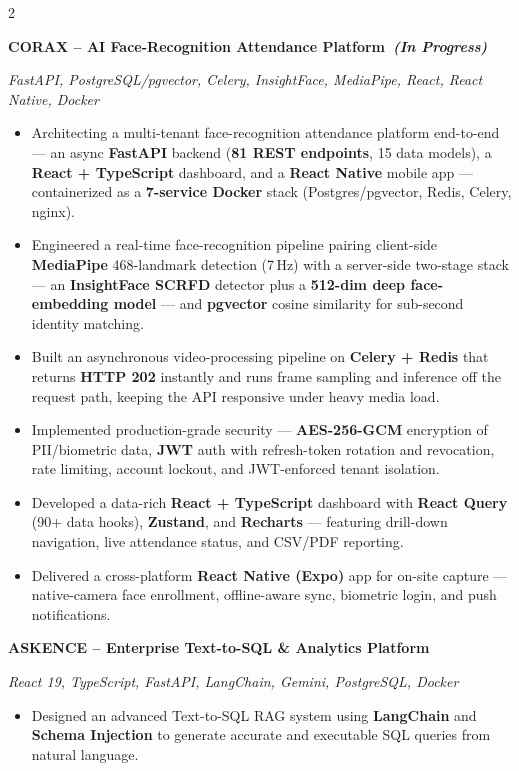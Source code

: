 \documentclass[11pt,a4paper,ragged2e,withhyper]{altacv}
\newcommand{\projecttitle}[1]{%
  \par\smallskip
  \needspace{4\baselineskip}%
  {\textcolor{VividPurple}{\normalsize\bfseries #1}}\par
}
\newcommand{\projectstack}[1]{%
  {\footnotesize\itshape #1}\par\vspace{0.5mm}
}
\newcommand{\projectsep}{%
  \par\vspace{1mm}
  {\color{gray!35}\noindent\makebox[\linewidth]{\dotfill}}
  \par\vspace{1mm}
}
\begin{document}
\begin{paracol}{2}
\switchcolumn
{}
\projecttitle{CORAX -- AI Face-Recognition Attendance Platform~{\normalfont\itshape\footnotesize\color{LightGrey}(In Progress)}}
\projectstack{FastAPI, PostgreSQL/pgvector, Celery, InsightFace, MediaPipe, React, React Native, Docker}
\begin{itemize}
\item Architecting a multi-tenant face-recognition attendance platform end-to-end --- an async \textbf{FastAPI} backend (\textbf{81 REST endpoints}, 15 data models), a \textbf{React + TypeScript} dashboard, and a \textbf{React Native} mobile app --- containerized as a \textbf{7-service Docker} stack (Postgres/pgvector, Redis, Celery, nginx).
\item Engineered a real-time face-recognition pipeline pairing client-side \textbf{MediaPipe} 468-landmark detection (7\,Hz) with a server-side two-stage stack --- an \textbf{InsightFace SCRFD} detector plus a \textbf{512-dim deep face-embedding model} --- and \textbf{pgvector} cosine similarity for sub-second identity matching.
\item Built an asynchronous video-processing pipeline on \textbf{Celery + Redis} that returns \textbf{HTTP 202} instantly and runs frame sampling and inference off the request path, keeping the API responsive under heavy media load.
\item Implemented production-grade security --- \textbf{AES-256-GCM} encryption of PII/biometric data, \textbf{JWT} auth with refresh-token rotation and revocation, rate limiting, account lockout, and JWT-enforced tenant isolation.
\item Developed a data-rich \textbf{React + TypeScript} dashboard with \textbf{React Query} (90+ data hooks), \textbf{Zustand}, and \textbf{Recharts} --- featuring drill-down navigation, live attendance status, and CSV/PDF reporting.
\item Delivered a cross-platform \textbf{React Native (Expo)} app for on-site capture --- native-camera face enrollment, offline-aware sync, biometric login, and push notifications.
\end{itemize}
\projectsep
\projecttitle{ASKENCE -- Enterprise Text-to-SQL \& Analytics Platform}
\projectstack{React 19, TypeScript, FastAPI, LangChain, Gemini, PostgreSQL, Docker}
\begin{itemize}
\item Designed an advanced Text-to-SQL RAG system using \textbf{LangChain} and \textbf{Schema Injection} to generate accurate and executable SQL queries from natural language.

\end{itemize}
\end{paracol}
\end{document}
